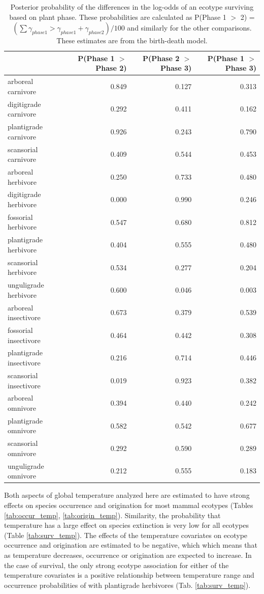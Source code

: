 \begin{table}[ht]
  \centering
  \caption[Posterior probablity estimates of differences in survival by plant phase]{Posterior probability of the differences in the log-odds of an ecotype surviving based on plant phase. These probabilities are calculated as P(Phase 1 \(>\) 2) = \( (\sum \gamma_{phase 1} > \gamma_{phase 1} + \gamma_{phase 2}) / 100\) and similarly for the other comparisons. These estimates are from the birth-death model.}
  \label{tab:surv_plant}
  \begin{tabular}{ l r r r }
    \hline
    & P(Phase 1 $>$ Phase 2) & P(Phase 2 $>$ Phase 3) & P(Phase 1 $>$ Phase 3) \\ 
    \hline
    arboreal carnivore & 0.849 & 0.127 & 0.313 \\ 
    digitigrade carnivore & 0.292 & 0.411 & 0.162 \\ 
    plantigrade carnivore & 0.926 & 0.243 & 0.790 \\ 
    scansorial carnivore & 0.409 & 0.544 & 0.453 \\ 
    arboreal herbivore & 0.250 & 0.733 & 0.480 \\ 
    digitigrade herbivore & 0.000 & 0.990 & 0.246 \\ 
    fossorial herbivore & 0.547 & 0.680 & 0.812 \\ 
    plantigrade herbivore & 0.404 & 0.555 & 0.480 \\ 
    scansorial herbivore & 0.534 & 0.277 & 0.204 \\ 
    unguligrade herbivore & 0.600 & 0.046 & 0.003 \\ 
    arboreal insectivore & 0.673 & 0.379 & 0.539 \\ 
    fossorial insectivore & 0.464 & 0.442 & 0.308 \\ 
    plantigrade insectivore & 0.216 & 0.714 & 0.446 \\ 
    scansorial insectivore & 0.019 & 0.923 & 0.382 \\ 
    arboreal omnivore & 0.394 & 0.440 & 0.242 \\ 
    plantigrade omnivore & 0.582 & 0.542 & 0.677 \\ 
    scansorial omnivore & 0.292 & 0.590 & 0.289 \\ 
    unguligrade omnivore & 0.212 & 0.555 & 0.183 \\ 
    \hline
  \end{tabular}
\end{table}


Both aspects of global temperature analyzed here are estimated to have strong effects on species occurrence and origination for most mammal ecotypes (Tables \ref{tab:occur_temp}, \ref{tab:origin_temp}). Similarity, the probability that temperature has a large effect on species extinction is very low for all ecotypes (Table \ref{tab:surv_temp}). The effects of the temperature covariates on ecotype occurrence and origination are estimated to be negative, which which means that as temperature decreases, occurrence or origination are expected to increase. In the case of survival, the only strong ecotype association for either of the temperature covariates is a positive relationship between temperature range and occurrence probabilities of with plantigrade herbivores (Tab. \ref{tab:surv_temp}).

